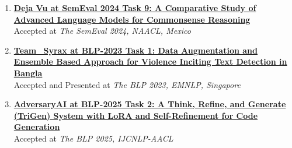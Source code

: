 
\vspace{0.3em}

\begin{enumerate}[label={}]
    \item \textbf{\href{https://aclanthology.org/2024.semeval-1.180.pdf}{Deja Vu at SemEval 2024 Task 9: A Comparative Study of Advanced Language Models for Commonsense Reasoning}} \\
    Accepted at \textit{The SemEval 2024, NAACL, Mexico} 

    \vspace{0.3em}
    
    \item \textbf{\href{https://aclanthology.org/2023.banglalp-1.32.pdf}{Team\_Syrax at BLP-2023 Task 1: Data Augmentation and Ensemble Based Approach for Violence Inciting Text Detection in Bangla}} \\
    Accepted and Presented at \textit{The BLP 2023, EMNLP, Singapore}  \\
    
    \vspace{-0.6em}
    
    \item \textbf{\href{https://aclanthology.org/2023.banglalp-1.32.pdf}{AdversaryAI at BLP-2025 Task 2: A Think, Refine, and Generate (TriGen) System with LoRA and Self-Refinement for Code Generation}} \\
    Accepted at \textit{The BLP 2025, IJCNLP-AACL}  \\

    \vspace{-.5em}
\end{enumerate}